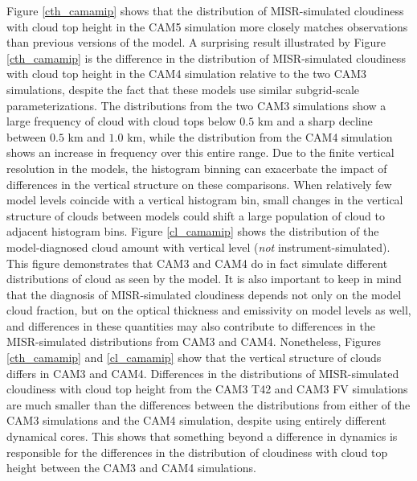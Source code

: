 Figure \ref{cth_camamip} shows that the distribution of MISR-simulated cloudiness with cloud top height in the CAM5 simulation more closely matches observations than previous versions of the model. A surprising result illustrated by Figure \ref{cth_camamip} is the difference in the distribution of MISR-simulated cloudiness with cloud top height in the CAM4 simulation relative to the two CAM3 simulations, despite the fact that these models use similar subgrid-scale parameterizations. The distributions from the two CAM3 simulations show a large frequency of cloud with cloud tops below $0.5$ km and a sharp decline between $0.5$ km and $1.0$ km, while the distribution from the CAM4 simulation shows an increase in frequency over this entire range. Due to the finite vertical resolution in the models, the histogram binning can exacerbate the impact of differences in the vertical structure on these comparisons. When relatively few model levels coincide with a vertical histogram bin, small changes in the vertical structure of clouds between models could shift a large population of cloud to adjacent histogram bins. Figure \ref{cl_camamip} shows the distribution of the model-diagnosed cloud amount with vertical level (\emph{not} instrument-simulated). This figure demonstrates that CAM3 and CAM4 do in fact simulate different distributions of cloud as seen by the model. It is also important to keep in mind that the diagnosis of MISR-simulated cloudiness depends not only on the model cloud fraction, but on the optical thickness and emissivity on model levels as well, and differences in these quantities may also contribute to differences in the MISR-simulated distributions from CAM3 and CAM4. Nonetheless, Figures \ref{cth_camamip} and \ref{cl_camamip} show that the vertical structure of clouds differs in CAM3 and CAM4. Differences in the distributions of MISR-simulated cloudiness with cloud top height from the CAM3 T42 and CAM3 FV simulations are much smaller than the differences between the distributions from either of the CAM3 simulations and the CAM4 simulation, despite using entirely different dynamical cores. This shows that something beyond a difference in dynamics is responsible for the differences in the distribution of cloudiness with cloud top height between the CAM3 and CAM4 simulations.

